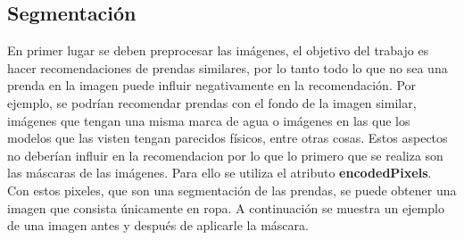 \documentclass[12pt]{report} %
\begin{document}
	\subsection{Segmentación}
	En primer lugar se deben preprocesar las imágenes, el objetivo del trabajo es hacer recomendaciones de prendas similares, por lo tanto
	todo lo que no sea una prenda en la imagen puede influir negativamente en la recomendación. Por ejemplo, se podrían recomendar prendas
	con el fondo de la imagen similar, imágenes que tengan una misma marca de agua o imágenes en las que los modelos que las visten tengan
	parecidos físicos, entre otras cosas.
	Estos aspectos no deberían influir en la recomendacion por lo que lo primero que se realiza son las máscaras de las imágenes. 
	Para ello se utiliza el atributo \textbf{encodedPixels}.
	Con estos pixeles, que son una segmentación de las prendas, se puede obtener una imagen que consista únicamente en ropa.
	A continuación se muestra un ejemplo de una imagen antes y después de aplicarle la máscara.
\end{document}
